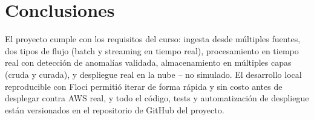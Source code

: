 \documentclass[11pt]{article}
\begin{document}
\section{Conclusiones}

El proyecto cumple con los requisitos del curso: ingesta desde múltiples fuentes, dos tipos de flujo (batch y streaming en tiempo real), procesamiento en tiempo real con detección de anomalías validada, almacenamiento en múltiples capas (cruda y curada), y despliegue real en la nube -- no simulado. El desarrollo local reproducible con Floci permitió iterar de forma rápida y sin costo antes de desplegar contra AWS real, y todo el código, tests y automatización de despliegue están versionados en el repositorio de GitHub del proyecto.
\end{document}
